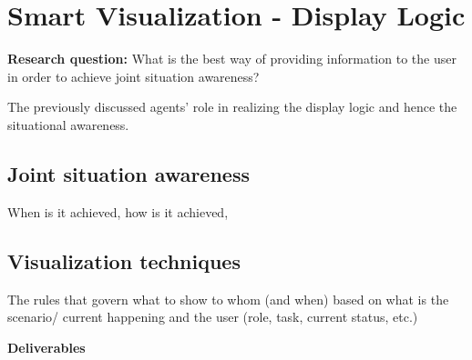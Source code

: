 \section{Smart Visualization - Display Logic}

\textbf{Research question:} What is the best way of providing information to the user in order to achieve joint situation awareness? 

The previously discussed agents' role in realizing the display logic and hence the situational awareness.

\subsection{Joint situation awareness}

When is it achieved, how is it achieved,

\subsection{Visualization techniques}

The rules that govern what to show to whom (and when) based on what is the scenario/ current happening and the user (role, task, current status, etc.) 

  
\textbf{Deliverables}
  
  
  
  
  
  
